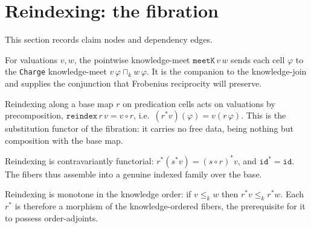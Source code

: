 \section{Reindexing: the fibration}

This section records claim nodes and dependency edges.

\begin{proposition}\label{thm:valuation-meetK}\leanok{}
For valuations $v, w$, the pointwise knowledge-meet $\texttt{meetK}\,v\,w$ sends
each cell $\varphi$ to the \texttt{Charge} knowledge-meet $v\,\varphi \sqcap_k
w\,\varphi$. It is the companion to the knowledge-join and supplies the
conjunction that Frobenius reciprocity will preserve.
\end{proposition}
\begin{proposition}[Reindexing]\label{thm:reindex}\leanok{}
Reindexing along a base map $r$ on predication cells acts on valuations by
precomposition, $\texttt{reindex}\,r\,v = v \circ r$, i.e.\ $(r^{*}v)(\varphi) =
v(r\,\varphi)$. This is the substitution functor of the fibration: it carries no
free data, being nothing but composition with the base map.
\end{proposition}
\begin{theorem}\label{thm:reindex-comp}\leanok{}
Reindexing is contravariantly functorial: $r^{*}(s^{*}v) = (s\circ r)^{*}v$, and
$\texttt{id}^{*} = \texttt{id}$. The fibers thus assemble into a genuine
indexed family over the base.
\end{theorem}
\begin{theorem}[Monotonicity]\label{thm:reindex-mono}\leanok{}
Reindexing is monotone in the knowledge order: if $v \le_k w$ then $r^{*}v \le_k
r^{*}w$. Each $r^{*}$ is therefore a morphism of the knowledge-ordered fibers,
the prerequisite for it to possess order-adjoints.
\end{theorem}

